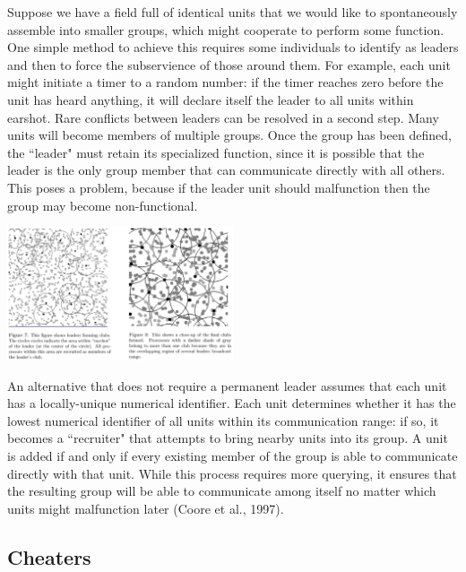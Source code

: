 \documentclass{article}
\begin{document}
Suppose we have a field full of identical units that we would like to spontaneously assemble into smaller groups, which might cooperate to perform some function. One simple method to achieve this requires some individuals to identify as leaders and then to force the subservience of those around them. For example, each unit might initiate a timer to a random number: if the timer reaches zero before the unit has heard anything, it will declare itself the leader to all units within earshot. Rare conflicts between leaders can be resolved in a second step. Many units will become members of multiple groups. Once the group has been defined, the ``leader" must retain its specialized function, since it is possible that the leader is the only group member that can communicate directly with all others. This poses a problem, because if the leader unit should malfunction then the group may become non-functional.

\begin{center}
\includegraphics[width=0.5\textwidth]{overlapping.pdf}
\end{center}


An alternative that does not require a permanent leader assumes that each unit has a locally-unique numerical identifier. Each unit determines whether it has the lowest numerical identifier of all units within its communication range: if so, it becomes a ``recruiter" that attempts to bring nearby units into its group. A unit is added if and only if every existing member of the group is able to communicate directly with that unit. While this process requires more querying, it ensures that the resulting group will be able to communicate among itself no matter which units might malfunction later (Coore et al., 1997).


\subsection*{Cheaters}
\end{document}
